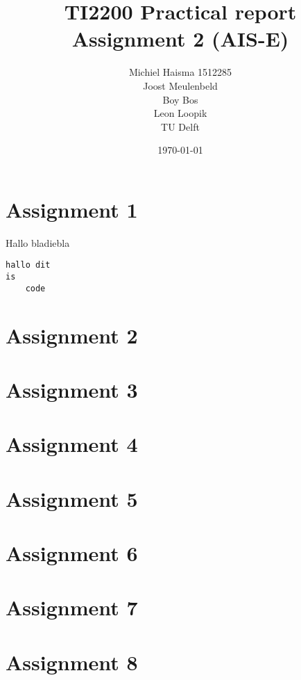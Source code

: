\documentclass[12pt]{article}
\title{TI2200 Practical report\\
Assignment 2 (AIS-E)}
\author{Michiel Haisma 1512285\\
Joost Meulenbeld\\
Boy Bos\\
Leon Loopik\\
TU Delft\\}
\date{\today}
\begin{document}
\maketitle

\section*{Assignment 1}
Hallo bladiebla

\begin{verbatim}
hallo dit
is 
	code
\end{verbatim}


\section*{Assignment 2}

\section*{Assignment 3}

\section*{Assignment 4}

\section*{Assignment 5}

\section*{Assignment 6}

\section*{Assignment 7}

\section*{Assignment 8}
\end{document}
